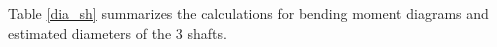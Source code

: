 Table \ref{dia_sh} summarizes the calculations for bending moment diagrams and estimated diameters of the 3 shafts.

